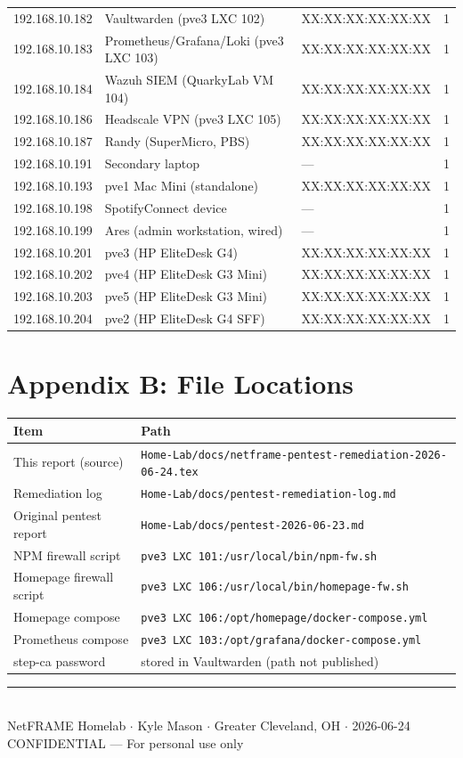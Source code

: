 \documentclass[11pt,a4paper]{article}
\begin{document}
\begin{longtable}{@{}llll@{}}
192.168.10.182 & Vaultwarden (pve3 LXC 102) & XX:XX:XX:XX:XX:XX & 1 \\
192.168.10.183 & Prometheus/Grafana/Loki (pve3 LXC 103) & XX:XX:XX:XX:XX:XX & 1 \\
192.168.10.184 & Wazuh SIEM (QuarkyLab VM 104) & XX:XX:XX:XX:XX:XX & 1 \\
192.168.10.186 & Headscale VPN (pve3 LXC 105) & XX:XX:XX:XX:XX:XX & 1 \\
192.168.10.187 & Randy (SuperMicro, PBS) & XX:XX:XX:XX:XX:XX & 1 \\
192.168.10.191 & Secondary laptop & — & 1 \\
192.168.10.193 & pve1 Mac Mini (standalone) & XX:XX:XX:XX:XX:XX & 1 \\
192.168.10.198 & SpotifyConnect device & — & 1 \\
192.168.10.199 & Ares (admin workstation, wired) & — & 1 \\
192.168.10.201 & pve3 (HP EliteDesk G4) & XX:XX:XX:XX:XX:XX & 1 \\
192.168.10.202 & pve4 (HP EliteDesk G3 Mini) & XX:XX:XX:XX:XX:XX & 1 \\
192.168.10.203 & pve5 (HP EliteDesk G3 Mini) & XX:XX:XX:XX:XX:XX & 1 \\
192.168.10.204 & pve2 (HP EliteDesk G4 SFF) & XX:XX:XX:XX:XX:XX & 1 \\
\bottomrule
\end{longtable}

\section{Appendix B: File Locations}

\begin{tabular}{ll}
\toprule
\textbf{Item} & \textbf{Path} \\
\midrule
This report (source) & \texttt{Home-Lab/docs/netframe-pentest-remediation-2026-06-24.tex} \\
Remediation log & \texttt{Home-Lab/docs/pentest-remediation-log.md} \\
Original pentest report & \texttt{Home-Lab/docs/pentest-2026-06-23.md} \\
NPM firewall script & \texttt{pve3 LXC 101:/usr/local/bin/npm-fw.sh} \\
Homepage firewall script & \texttt{pve3 LXC 106:/usr/local/bin/homepage-fw.sh} \\
Homepage compose & \texttt{pve3 LXC 106:/opt/homepage/docker-compose.yml} \\
Prometheus compose & \texttt{pve3 LXC 103:/opt/grafana/docker-compose.yml} \\
step-ca password & stored in Vaultwarden (path not published) \\
\bottomrule
\end{tabular}

\vfill
\begin{center}
\rule{0.6\linewidth}{0.4pt}\\[0.5em]
{\small\color{gray}
NetFRAME Homelab $\cdot$ Kyle Mason $\cdot$ Greater Cleveland, OH $\cdot$ 2026-06-24\\
CONFIDENTIAL — For personal use only
}
\end{center}
\end{document}
